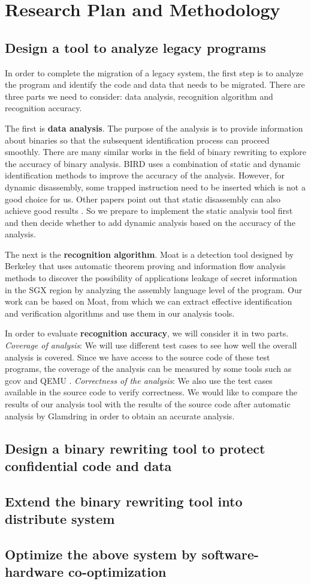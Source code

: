 \section{Research Plan and Methodology}
\subsection{Design a tool to analyze legacy programs}
In order to complete the migration of a legacy system, the first step is
to analyze the program and identify the code and data that needs to be migrated.
There are three parts we need to consider: data analysis, recognition algorithm
and recognition accuracy.

The first is \textbf{data analysis}. The purpose of the analysis is to provide
information about binaries so that the subsequent identification process can
proceed smoothly.
There are many similar works in the field of binary rewriting to explore
the accuracy of binary analysis.
BIRD \cite{Nanda2006BIRDBI} uses a combination of static and dynamic identification
methods to improve the accuracy of the analysis. However, for dynamic disassembly,
some trapped instruction need to be inserted which is not a good choice for us.
Other papers point out that static disassembly can also achieve good results
\cite{Andriesse2016AnIA}. So we prepare to implement the static analysis tool first
and then decide whether to add dynamic analysis based on the accuracy of the analysis.

The next is the \textbf{recognition algorithm}.
Moat \cite{Sinha2015MoatVC} is a detection tool designed by Berkeley that uses
automatic theorem proving and information flow analysis methods to discover the
possibility of applications leakage of secret information in the SGX region by
analyzing the assembly language level of the program.
Our work can be based on Moat, from which we can extract effective identification
and verification algorithms and use them in our analysis tools. 

In order to evaluate \textbf{recognition accuracy}, we will consider it in two parts.
\textit{Coverage of analysis}:
We will use different test cases to see how well the overall analysis is covered.
Since we have access to the source code of these test programs,
the coverage of the analysis can be measured by some tools such as gcov \cite{GCOV}
and QEMU \cite{Bellard2005QEMUAF}.
\textit{Correctness of the analysis}:
We also use the test cases available in the source code to verify correctness.
We would like to compare the results of our analysis tool with the results of the source code
after automatic analysis by Glamdring \cite{Lind2017GlamdringAA} in order to obtain
an accurate analysis.

\subsection{Design a binary rewriting tool to protect confidential code and data}

\subsection{Extend the binary rewriting tool into distribute system}

\subsection{Optimize the above system by software-hardware co-optimization}

